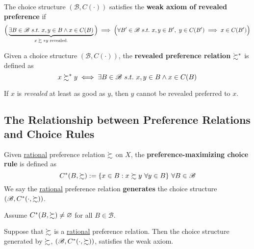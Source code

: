 \documentclass{article}
\begin{document}
		\begin{definition}[1.C.1]
			The choice structure $(\mathscr{B}, C(\cdot))$ satisfies the \textbf{weak axiom of revealed preference} if
			\begin{equation}
				\Big(\underbrace{
					\exists B \in \mathscr{B}\ s.t.\ x, y \in B \land x \in C(B)
					}_{\text{{$x \succsim* y$ revealed.}}}
				\Big)
				\implies 
				\Big(
					\forall B' \in \mathscr{B}\ s.t.\ x, y \in B',\ y \in C(B') \implies x \in C(B')
				\Big)
			\end{equation}
		\end{definition}
		
		\begin{definition}
			Given a choice structure $(\mathscr{B}, C(\cdot))$, the \textbf{revealed preference relation} $\succsim^*$ is defined as
			\begin{equation}
				x \pref^* y \iff \exists B \in \mathscr{B}\ s.t.\ x, y \in B \land x \in C(B)
			\end{equation}
		\end{definition}
		
		\begin{remark}
			If $x$ is \emph{revealed} at least as good as $y$, then $y$ cannot be revealed preferred to $x$.
		\end{remark}
	
	\subsection{The Relationship between Preference Relations and Choice Rules}
		\begin{definition}
			Given \ul{rational} preference relation $\succsim$ on $X$, the \textbf{preference-maximizing choice rule} is defined as 
			\begin{equation}
				C^*(B, \pref) := \{x \in B: x \pref y\ \forall y \in B\}\ \forall B \in \mathscr{B}
			\end{equation}
			We say the \ul{rational} preference relation \textbf{generates} the choice structure $(\mathscr{B}, C^*(\cdot, \succsim))$.
		\end{definition}
		
		\begin{assumption}
			Assume $C^*(B, \succsim) \neq \varnothing$ for all $B \in \mathscr{B}$.
		\end{assumption}
		
		\begin{proposition}
			Suppose that $\succsim$ is a \ul{rational} preference relation. Then the choice structure generated by $\succsim$, $(\mathscr{B}, C^*(\cdot, \succsim))$, satisfies the weak axiom.
		\end{proposition}
		
\end{document}
